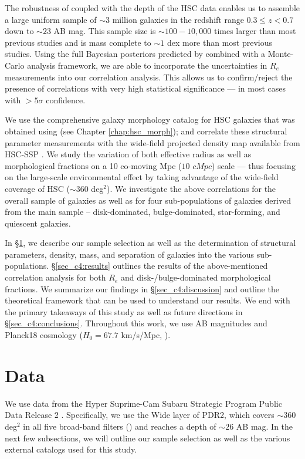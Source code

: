 The robustness of \gampen{} coupled with the depth of the HSC data enables us to assemble a large uniform sample of $\sim3$ million galaxies in the redshift range $0.3 \leq z < 0.7$ down to $\sim23$ AB mag. This sample size is $\sim100-10,000$ times larger than most previous studies and is mass complete to $\sim1$ dex more than most previous studies. Using the full Bayesian posteriors predicted by \gampen{} combined with a Monte-Carlo analysis framework, we are able to incorporate the uncertainties in $R_e$ measurements into our correlation analysis. This allows us to confirm/reject the presence of correlations with very high statistical significance --- in most cases with $>5\sigma$ confidence.

We use the comprehensive galaxy morphology catalog for HSC galaxies that was obtained using \gampen{} (see Chapter \ref{chap:hsc_morph}); and correlate these structural parameter measurements with the wide-field projected density map available from HSC-SSP \citep{hsc_den}. We study the variation of both effective radius as well as morphological fractions on a 10 co-moving Mpc ($10\,\,cMpc$) scale ---  thus focusing on the large-scale environmental effect by taking advantage of the wide-field coverage of HSC ($\sim 360$ deg$^2$). We investigate the above correlations for the overall sample of galaxies as well as for four sub-populations of galaxies derived from the main sample -- disk-dominated, bulge-dominated, star-forming, and quiescent galaxies.

In \S \ref{sec_c4:data}, we describe our sample selection as well as the determination of structural parameters, density, mass, and separation of galaxies into the various sub-populations. \S \ref{sec_c4:results} outlines the results of the above-mentioned correlation analysis for both $R_e$ and disk-/bulge-dominated morphological fractions. We summarize our findings in \S \ref{sec_c4:discussion} and outline the theoretical framework that can be used to understand our results. We end with the primary takeaways of this study as well as future directions in \S \ref{sec_c4:conclusions}. Throughout this work, we use AB magnitudes and Planck18 cosmology ($H_0=67.7$ km/s/Mpc, \citealp{planck18}).

\section{Data} \label{sec_c4:data}
We use data from the Hyper Suprime-Cam Subaru Strategic Program Public Data Release 2 \citep[PDR2;][]{hsc_pdr2}. Specifically, we use the Wide layer of PDR2, which covers $\sim360$ deg$^2$ in all five broad-band filters (\gb\rb\ib\zb\yb) and reaches a depth of $\sim26$ AB mag. In the next few subsections, we will outline our sample selection as well as the various external catalogs used for this study. 

